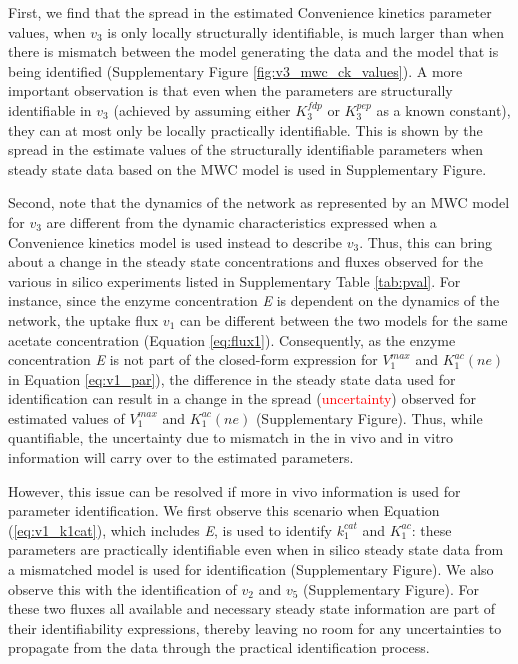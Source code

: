 \documentclass[10pt]{article}
\begin{document}
	First, we find that the spread in the estimated Convenience kinetics parameter values, when $v_3$ is only locally structurally identifiable, is much larger than when there is mismatch between the model generating the data and the model that is being identified (Supplementary Figure \ref{fig:v3_mwc_ck_values}). A more important observation is that even when the parameters are structurally identifiable in $v_3$ (achieved by assuming either $K_3^{fdp}$ or $K_3^{pep}$ as a known constant), they can at most only be locally practically identifiable. This is shown by the spread in the estimate values of the structurally identifiable parameters when steady state data based on the MWC model is used in Supplementary Figure.
	
	Second, note that the dynamics of the network as represented by an MWC model for $v_3$ are different from the dynamic characteristics expressed when a Convenience kinetics model is used instead to describe $v_3$. Thus, this can bring about a change in the steady state concentrations and fluxes observed for the various in silico experiments listed in Supplementary Table \ref{tab:pval}. For instance, since the enzyme concentration \textit{E} is dependent on the dynamics of the network, the uptake flux $v_1$ can be different between the two models for the same acetate concentration (Equation \ref{eq:flux1}). Consequently, as the enzyme concentration \textit{E} is not part of the closed-form expression for $V_1^{max}$ and $K_1^{ac}(ne)$ in Equation \ref{eq:v1_par}), the difference in the steady state data used for identification can result in a change in the spread (\textcolor{red}{uncertainty}) observed for estimated values of $V_1^{max}$ and $K_1^{ac}(ne)$ (Supplementary Figure). Thus, while quantifiable, the uncertainty due to mismatch in the in vivo and in vitro information will carry over to the estimated parameters. 
	
	However, this issue can be resolved if more in vivo information is used for parameter identification. We first observe this scenario when Equation (\ref{eq:v1_k1cat}), which includes \textit{E}, is used to identify $k_1^{cat}$ and $K_1^{ac}$: these parameters are practically identifiable even when in silico steady state data from a mismatched model is used for identification (Supplementary Figure). We also observe this with the identification of $v_2$ and $v_5$ (Supplementary Figure). For these two fluxes all available and necessary steady state information are part of their identifiability expressions, thereby leaving no room for any uncertainties to propagate from the data through the practical identification process.
	
\end{document}
